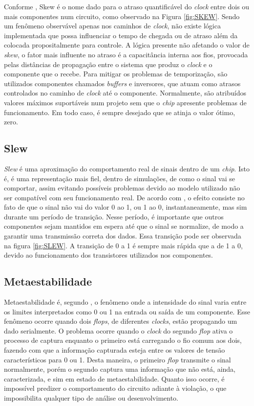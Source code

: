 \documentclass[
	12pt,				%
    oneside,			%
	a4paper,			%
	english,			%
	french,				%
	spanish,			%
	brazil				%
	]{abntex2}
\begin{document}
Conforme \citeauthor{Bhasker}, Skew é o nome dado para o atraso quantificável do \textit{clock} entre dois ou mais componentes num circuito, como observado na Figura \ref{fig:SKEW}. Sendo um fenômeno observável apenas nos caminhos de \textit{clock}, não existe lógica implementada que possa influenciar o tempo de chegada ou de atraso além da colocada propositalmente para controle. A lógica presente não afetando o valor de \textit{skew}, o fator mais influente no atraso é a capacitância interna aos fios, provocada pelas distâncias de propagação entre o sistema que produz o \textit{clock} e o componente que o recebe. Para mitigar os problemas de temporização, são utilizados componentes chamados \textit{buffers} e inversores, que atuam como atrasos controlados no caminho de \textit{clock} até o componente. Normalmente, são atribuídos valores máximos suportáveis num projeto sem que o \textit{chip} apresente problemas de funcionamento. Em todo caso, é sempre desejado que se atinja o valor ótimo, zero.

\subsection{Slew}

\textit{Slew} é uma aproximação do comportamento real de sinais dentro de um \textit{chip}. Isto é, é uma representação mais fiel, dentro de simulações, de como o sinal vai se comportar, assim evitando possíveis problemas devido ao modelo utilizado não ser compatível com seu funcionamento real. De acordo com \citeauthor{Bakshi}, o efeito consiste no fato de que o sinal não vai do valor 0 ao 1, ou 1 ao 0, instantaneamente, mas sim durante um período de transição. Nesse período, é importante que outros componentes sejam mantidos em espera até que o sinal se normalize, de modo a garantir uma transmissão correta dos dados. Essa transição pode ser observada na figura \ref{fig:SLEW}. A transição de 0 a 1 é sempre mais rápida que a de 1 a 0, devido ao funcionamento dos transistores utilizados nos componentes.



\subsection{Metaestabilidade}

Metaestabilidade é, segundo \citeauthor{Ben}, o fenômeno onde a intensidade do sinal varia entre os limites interpretados como 0 ou 1 na entrada ou saída de um componente. Esse fenômeno ocorre quando dois \textit{flops}, de diferentes \textit{clocks}, estão propagando um dado serialmente. O problema ocorre quando o \textit{clock} do segundo \textit{flop} ativa o processo de captura enquanto o primeiro está carregando o fio comum aos dois, fazendo com que a informação capturada esteja entre os valores de tensão característicos para 0 ou 1. Desta maneira, o primeiro \textit{flop} transmite o sinal normalmente, porém o segundo captura uma informação que não está, ainda, caracterizada, e sim em estado de metaestabilidade. Quanto isso ocorre, é impossível predizer o comportamento do circuito adiante à violação, o que impossibilita qualquer tipo de análise ou desenvolvimento.
\end{document}
